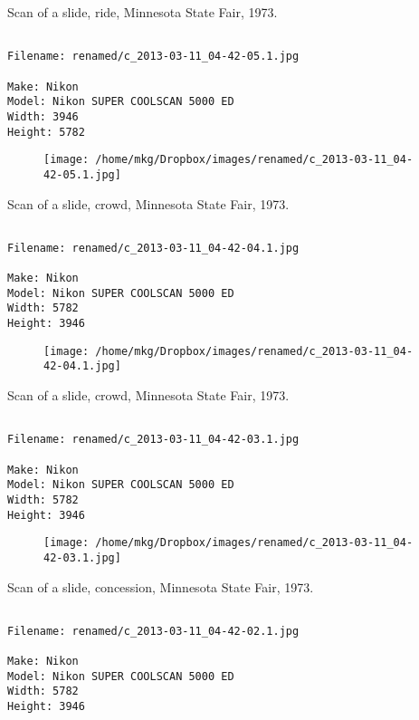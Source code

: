 \clearpage
\onecolumn
\noindent Scan of a slide, ride, Minnesota State Fair, 1973.
\noindent
\begin{lstlisting}

Filename: renamed/c_2013-03-11_04-42-05.1.jpg

Make: Nikon
Model: Nikon SUPER COOLSCAN 5000 ED
Width: 3946
Height: 5782
\end{lstlisting}
\clearpage

\begin{figure}
\texttt{[image: /home/mkg/Dropbox/images/renamed/c\_2013-03-11\_04-42-05.1.jpg]}
\end{figure}
    
\clearpage
\onecolumn
\noindent Scan of a slide, crowd, Minnesota State Fair, 1973.
\noindent
\begin{lstlisting}

Filename: renamed/c_2013-03-11_04-42-04.1.jpg

Make: Nikon
Model: Nikon SUPER COOLSCAN 5000 ED
Width: 5782
Height: 3946
\end{lstlisting}
\clearpage

\begin{figure}
\texttt{[image: /home/mkg/Dropbox/images/renamed/c\_2013-03-11\_04-42-04.1.jpg]}
\end{figure}
    
\clearpage
\onecolumn
\noindent Scan of a slide, crowd, Minnesota State Fair, 1973.
\noindent
\begin{lstlisting}

Filename: renamed/c_2013-03-11_04-42-03.1.jpg

Make: Nikon
Model: Nikon SUPER COOLSCAN 5000 ED
Width: 5782
Height: 3946
\end{lstlisting}
\clearpage

\begin{figure}
\texttt{[image: /home/mkg/Dropbox/images/renamed/c\_2013-03-11\_04-42-03.1.jpg]}
\end{figure}
    
\clearpage
\onecolumn
\noindent Scan of a slide, concession, Minnesota State Fair, 1973.
\noindent
\begin{lstlisting}

Filename: renamed/c_2013-03-11_04-42-02.1.jpg

Make: Nikon
Model: Nikon SUPER COOLSCAN 5000 ED
Width: 5782
Height: 3946
\end{lstlisting}
\clearpage

